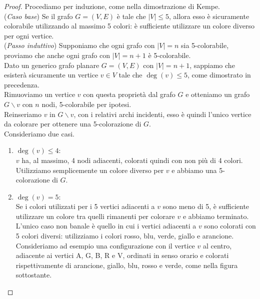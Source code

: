 \documentclass[a4paper,12pt,titlepage]{report}
\begin{document}
    \begin{proof}
    	Procediamo per induzione, come nella dimostrazione di Kempe.
    	\\(\emph{Caso base}) Se il grafo $G = (V, E)$ è tale che $\lvert V \rvert \leq 5$, allora esso è sicuramente colorabile utilizzando al massimo 5 colori: è sufficiente utilizzare un colore diverso per ogni vertice.
    	\\(\emph{Passo induttivo}) Supponiamo che ogni grafo con $\lvert V \rvert = n$ sia 5-colorabile, proviamo che anche ogni grafo con $\lvert V \rvert = n + 1$ è 5-colorabile.
    	\\Dato un generico grafo planare $G = (V, E)$ con $\lvert V \rvert = n + 1$, sappiamo che esisterà sicuramente un vertice $v \in V$ tale che $\deg(v) \leq 5$, come dimostrato in precedenza.
    	\\Rimuoviamo un vertice $v$ con questa proprietà dal grafo $G$ e otteniamo un grafo $G \smallsetminus v$ con $n$ nodi, 5-colorabile per ipotesi.
    	\\Reinseriamo $v$ in $G \smallsetminus v$, con i relativi archi incidenti, esso è quindi l'unico vertice da colorare per ottenere una 5-colorazione di $G$.
    	\\Consideriamo due casi.
    	\begin{enumerate}
    		\item $\deg(v) \leq 4$:
    		\\$v$ ha, al massimo, 4 nodi adiacenti, colorati quindi con non più di 4 colori.
    		\\Utilizziamo semplicemente un colore diverso per $v$ e abbiamo una 5-colorazione di $G$.
    		\item $\deg(v) = 5$:
    		\\Se i colori utilizzati per i 5 vertici adiacenti a $v$ sono meno di 5, è sufficiente utilizzare un colore tra quelli rimanenti per colorare $v$ e abbiamo terminato.
    		\\L'unico caso non banale è quello in cui i vertici adiacenti a $v$ sono colorati con 5 colori diversi: utilizziamo i colori rosso, blu, verde, giallo e arancione.
    		\\Consideriamo ad esempio una configurazione con il vertice $v$ al centro, adiacente ai vertici A, G, B, R e V, ordinati in senso orario e colorati rispettivamente di arancione, giallo, blu, rosso e verde, come nella figura sottostante.
    		\begin{figure}[H]
    			\centering
\end{figure}
\end{enumerate}
\end{proof}
\end{document}
